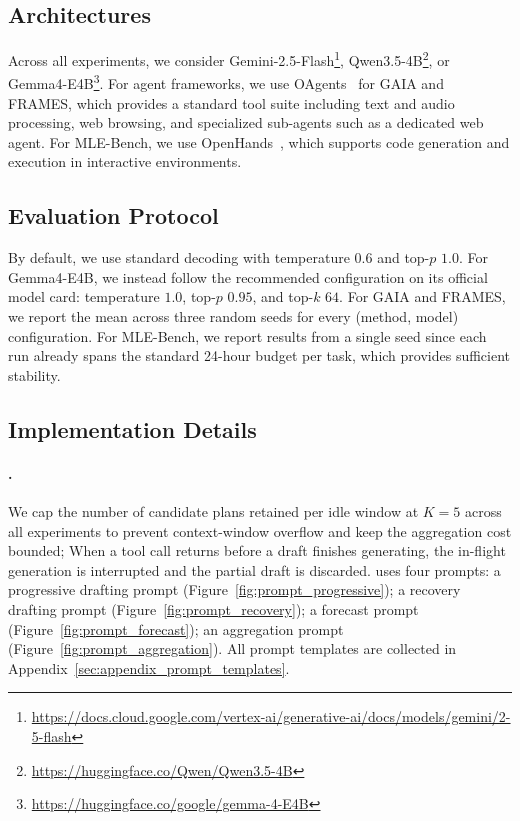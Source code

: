 \subsection{Architectures}
\label{sec:appendix_model_settings}
Across all experiments, we consider Gemini-2.5-Flash\footnote{\url{https://docs.cloud.google.com/vertex-ai/generative-ai/docs/models/gemini/2-5-flash}}, Qwen3.5-4B\footnote{\url{https://huggingface.co/Qwen/Qwen3.5-4B}}, or Gemma4-E4B\footnote{\url{https://huggingface.co/google/gemma-4-E4B}}.
For agent frameworks, we use OAgents~\citep{zhu2025oagents} for GAIA 
and FRAMES, which provides a standard tool suite including text and 
audio processing, web browsing, and specialized sub-agents such as a 
dedicated web agent. For MLE-Bench, we use OpenHands~\citep{wang2025openhands},
which supports code generation and execution in interactive environments.


\subsection{Evaluation Protocol} By default, we use standard decoding with temperature $0.6$ and top-$p$ $1.0$. For Gemma4-E4B, we instead follow the recommended configuration on its official model card: temperature $1.0$, top-$p$ $0.95$, and top-$k$ $64$.
For GAIA and FRAMES, we report the mean across three random seeds for every (method, model) configuration. For MLE-Bench, we report results from a single seed since each run already spans the standard 24-hour budget per task, which provides sufficient stability.

\subsection{Implementation Details}
\label{sec:appendix_implementation_details}
\label{sec:appendix_prompts}
\label{sec:appendix_idlespec}

\paragraph{\methodname.}
We cap the number of candidate plans retained per idle window at $K{=}5$ across all experiments to prevent context-window overflow and keep the aggregation cost bounded; When a tool call returns before a draft finishes generating, 
the in-flight generation is interrupted and the partial draft is discarded. 
\methodname uses four prompts: a progressive drafting prompt (Figure~\ref{fig:prompt_progressive}); a recovery drafting prompt (Figure~\ref{fig:prompt_recovery}); a forecast prompt (Figure~\ref{fig:prompt_forecast}); an aggregation prompt (Figure~\ref{fig:prompt_aggregation}). All prompt templates are collected in Appendix~\ref{sec:appendix_prompt_templates}.

